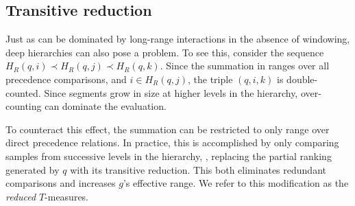 \documentclass{article}
\begin{document}
\subsection{Transitive reduction}
\label{sec:transitive}

Just as  can be dominated by long-range interactions in the absence of windowing, deep hierarchies can also pose a problem.
To see this, consider the sequence $H_R(q, i) \prec H_R(q, j) \prec H_R(q, k)$.
Since the summation in  ranges over all precedence comparisons, and $i \in H_R(q, j)$, the
triple $(q, i, k)$ is double-counted.
Since segments grow in size at higher levels in the hierarchy, over-counting can dominate the evaluation.

To counteract this effect, the summation can be restricted to only range over direct precedence relations.
In practice, this is accomplished by only comparing samples from successive levels in the hierarchy, \ie, 
replacing the partial ranking generated by $q$ with its transitive reduction.
This both eliminates redundant comparisons and increases $g$'s effective range.
We refer to this modification as the \emph{reduced} $T$-measures.




\end{document}

